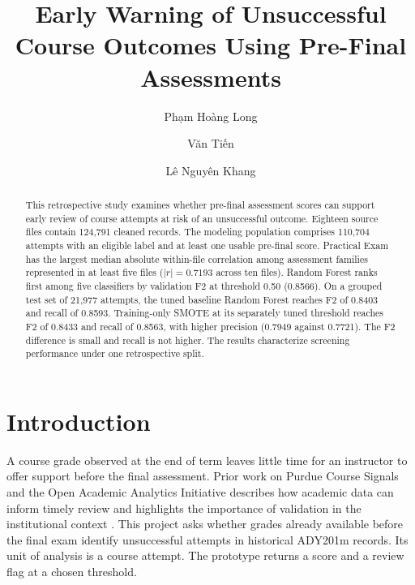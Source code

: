 \documentclass[runningheads]{llncs}
\begin{document}
\title{Early Warning of Unsuccessful Course Outcomes Using Pre-Final Assessments}
\author{{\vn Phạm Hoàng Long} \and {\vn Văn Tiến} \and {\vn Lê Nguyên Khang}}
\maketitle

\begin{abstract}
This retrospective study examines whether pre-final assessment scores can support early review of course attempts at risk of an unsuccessful outcome. Eighteen source files contain 124,791 cleaned records. The modeling population comprises 110,704 attempts with an eligible label and at least one usable pre-final score. Practical Exam has the largest median absolute within-file correlation among assessment families represented in at least five files ($|r|=0.7193$ across ten files). Random Forest ranks first among five classifiers by validation F2 at threshold 0.50 (0.8566). On a grouped test set of 21,977 attempts, the tuned baseline Random Forest reaches F2 of 0.8403 and recall of 0.8593. Training-only SMOTE at its separately tuned threshold reaches F2 of 0.8433 and recall of 0.8563, with higher precision (0.7949 against 0.7721). The F2 difference is small and recall is not higher. The results characterize screening performance under one retrospective split.
\end{abstract}

\section{Introduction}
A course grade observed at the end of term leaves little time for an instructor to offer support before the final assessment. Prior work on Purdue Course Signals and the Open Academic Analytics Initiative describes how academic data can inform timely review and highlights the importance of validation in the institutional context \cite{arnold,jaya}. This project asks whether grades already available before the final exam identify unsuccessful attempts in historical ADY201m records. Its unit of analysis is a course attempt. The prototype returns a score and a review flag at a chosen threshold.
\end{document}
